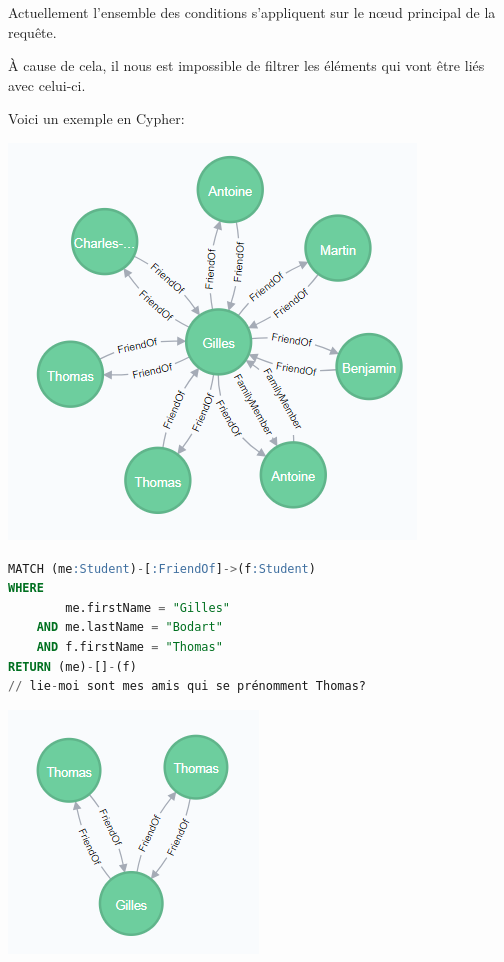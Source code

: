 \documentclass[a4paper,fleqn,12pt]{report}
\begin{document}
Actuellement l'ensemble des conditions s'appliquent sur le nœud principal de la requête.

\`A cause de cela, il nous est impossible de filtrer les éléments qui vont être liés avec celui-ci. 

Voici un exemple en Cypher:

\begin{center}
\includegraphics[scale=1]{figures/friendOf.png}
\label{fig:friendOf}
\end{center}
 
\begin{lstlisting}[language=SQL]
MATCH (me:Student)-[:FriendOf]->(f:Student)
WHERE
	    me.firstName = "Gilles"
	AND me.lastName = "Bodart"
	AND	f.firstName = "Thomas" 
RETURN (me)-[]-(f)
// lie-moi sont mes amis qui se prénomment Thomas?
\end{lstlisting} 

\begin{center}
\includegraphics[scale=1]{figures/friendOfFilt.png}
\label{fig:friendOfFilt}
\end{center}
\end{document}
